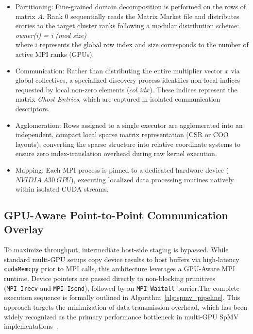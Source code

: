 \documentclass[conference]{IEEEtran}
\begin{document}
\begin{itemize}
\item Partitioning: Fine-grained domain decomposition is performed on the rows of matrix $A$. Rank 0 sequentially reads the Matrix Market file and distributes entries to the target cluster ranks following a modular distribution scheme:
        \textit{owner(i) = i (mod size)} \\
    where $i$ represents the global row index and $\text{size}$ corresponds to the number of active MPI ranks (GPUs).
    \item Communication: Rather than distributing the entire multiplier vector $x$ via global collectives, a specialized discovery process identifies non-local indices requested by local non-zero elements ($col\_idx$). These indices represent the matrix \textit{Ghost Entries}, which are captured in isolated communication descriptors.
    \item Agglomeration: Rows assigned to a single executor are agglomerated into an independent, compact local sparse matrix representation (CSR or COO layouts), converting the sparse structure into relative coordinate systems to ensure zero index-translation overhead during raw kernel execution.
    \item Mapping: Each MPI process is pinned to a dedicated hardware device ($NVIDIA\ A30\ GPU$), executing localized data processing routines natively within isolated CUDA streams.
\end{itemize}

\subsection{GPU-Aware Point-to-Point Communication Overlay}
\label{sec:gpu_aware_comm}
To maximize throughput, intermediate host-side staging is bypassed. While standard multi-GPU setups copy device results to host buffers via high-latency \texttt{cudaMemcpy} prior to MPI calls, this architecture leverages a GPU-Aware MPI runtime. Device pointers are passed directly to non-blocking primitives (\texttt{MPI\_Irecv} and \texttt{MPI\_Isend}), followed by an \texttt{MPI\_Waitall} barrier.The complete execution sequence is formally outlined in Algorithm~\ref{alg:spmv_pipeline}. This approach targets the minimization of data transmission overhead, which has been widely recognized as the primary performance bottleneck in multi-GPU SpMV implementations~\cite{gao2024optimization}.
\end{document}
